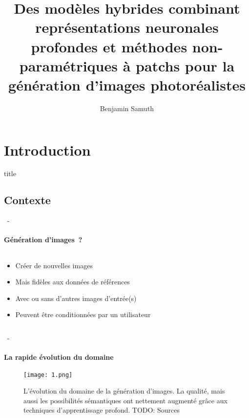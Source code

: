 \documentclass[aspectratio=169, 22pt]{beamer}
\title[Modèles hybrides pour la génération d'images]{Des modèles hybrides combinant représentations neuronales profondes et méthodes non-paramétriques à patchs pour la génération d'images photoréalistes}
\subtitle{}
\author[Benjamin Samuth]{Benjamin Samuth}
\institute[Normandie University]{Normandie Univ, UNICAEN, ENSICAEN, CNRS, GREYC, Caen, FRANCE}
\begin{document}
\begin{frame}
  \titlepage
\end{frame}

\section{Introduction}
\begin{frame}
  \begin{beamercolorbox}[sep=15pt,center,shadow=true,rounded=true]{title}
    \LARGE\bfseries \secname
  \end{beamercolorbox}
\end{frame}

\subsection{Contexte}
\begin{frame}{\secname~- \subsecname}
  \framesubtitle{Génération d'images~?}
  \begin{columns}
    \begin{column}{0.5\linewidth}      
      \begin{itemize}
      \item Créer de \alert{nouvelles} images
      \item Mais fidèles aux données de références
      \item Avec ou sans d'autres images d'entrée(s)
      \item Peuvent être conditionnées par un utilisateur
      \end{itemize}
    \end{column}
    \begin{column}{0.5\linewidth}
    \end{column}
  \end{columns}
\end{frame}

\begin{frame}{\secname~- \subsecname}
  \framesubtitle{La rapide évolution du domaine}
  \begin{figure}
    \centering
    \texttt{[image: 1.png]}
    \caption{L'évolution du domaine de la génération d'images. La
      \alert{qualité}, mais aussi les \alert{possibilités sémantiques} ont nettement
      augmenté grâce aux techniques d'apprentissage profond. \alert{TODO: Sources}}
  \end{figure}
\end{frame}
\end{document}

